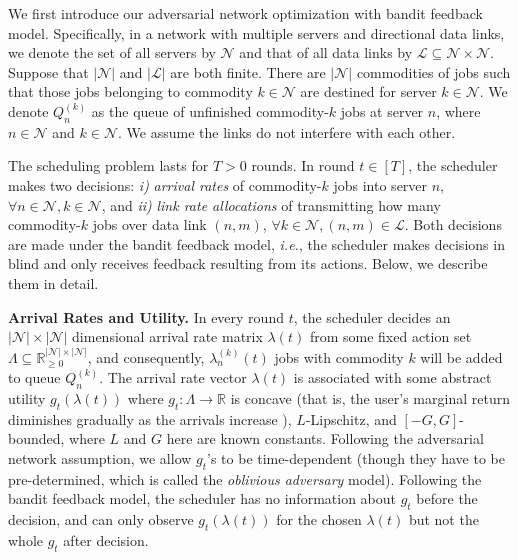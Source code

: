 \documentclass[11pt,fullpage,letterpaper]{article} %
\renewcommand{\bm}[1]{#1}%
\newcommand{\mN}{{\mathcal N}}
\newcommand{\mL}{{\mathcal L}}
\begin{document}
We first introduce our adversarial network optimization with bandit feedback model. 
Specifically, in a network with multiple servers and directional data links, we denote the set of all servers by $\mN$ and that of all data links by $\mL\subseteq \mN\times \mN$. Suppose that $\lvert \mN\rvert$ and $\lvert \mL\rvert$ are both finite.
There are $\lvert \mN\rvert$ commodities of jobs such that those jobs belonging to commodity $k\in \mN$ are destined for server $k\in \mN$.
We denote $Q_n^{(k)}$ as the queue of unfinished commodity-$k$ jobs at server $n$, where $n\in \mN$ and $k\in \mN$. We assume the links do not interfere with each other. 

The scheduling problem lasts for $T>0$ rounds. In round $t\in [T]$, the scheduler makes two decisions: \textit{i)} \textit{arrival rates} of commodity-$k$ jobs into server $n$, $\forall n\in \mN,k\in \mN$, and \textit{ii)} \textit{link rate allocations} of transmitting how many commodity-$k$ jobs over data link $(n,m)$, $\forall k\in \mN,(n,m)\in \mL$. Both decisions are made under the bandit feedback model, \textit{i.e.}, the scheduler makes decisions in blind and only receives feedback resulting from its actions. 
Below, we describe them in detail. 

\textbf{Arrival Rates and Utility.} In every round $t$, the scheduler decides an $\lvert \mN\rvert\times \lvert \mN\rvert$ dimensional arrival rate matrix $\bm \lambda(t)$ from some fixed action set $\Lambda\subseteq \mathbb R_{\ge 0}^{\lvert \mN\rvert\times \lvert \mN\rvert}$, and consequently, $\lambda_n^{(k)}(t)$ jobs with commodity $k$ will be added to queue $Q_n^{(k)}$.
The arrival rate vector $\bm \lambda(t)$ is associated with some abstract utility $g_{t}(\bm \lambda(t))$ where $g_t\colon \Lambda\to \mathbb R$ is concave (that is, the user's marginal return diminishes gradually as the arrivals increase \citep{huang2011utility,huang2012lifo}), $L$-Lipschitz, and $[-G,G]$-bounded, where $L$ and $G$ here are known constants.
Following the adversarial network assumption, we allow $g_t$'s to be time-dependent (though they have to be pre-determined, which is called the \textit{oblivious adversary} model).
Following the bandit feedback model, the scheduler has no information about $g_t$ before the decision, and can only observe $g_t(\bm \lambda(t))$ for the chosen $\bm \lambda(t)$ but not the whole $g_t$ after decision. 
\end{document}
